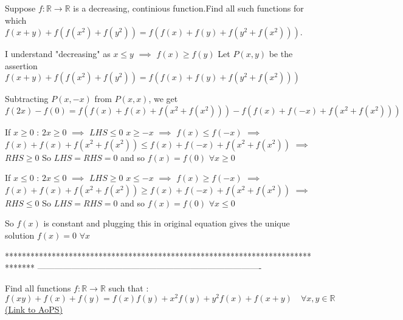 \begin{solution}
	\begin{tcolorbox}Suppose $f: \mathbb{R}\to\mathbb{R}$ is a decreasing, continious function.Find all such functions for which $f(x+y)+f(f(x^2)+f(y^2))=f(f(x)+f(y)+f(y^2+f(x^2)))$.\end{tcolorbox}
I understand "decreasing" as $x\le y$ $\implies$ $f(x)\ge f(y)$
Let $P(x,y)$ be the assertion $f(x+y)+f(f(x^2)+f(y^2))=f(f(x)+f(y)+f(y^2+f(x^2)))$

Subtracting $P(x,-x)$ from $P(x,x)$, we get $f(2x)-f(0)=f(f(x)+f(x)+f(x^2+f(x^2)))-f(f(x)+f(-x)+f(x^2+f(x^2)))$

If $x\ge 0$ :
$2x\ge 0$ $\implies$ $LHS \le  0$
$x\ge -x$ $\implies$ $f(x)\le f(-x)$ $\implies$ $f(x)+f(x)+f(x^2+f(x^2))\le f(x)+f(-x)+f(x^2+f(x^2))$ $\implies$ $RHS\ge 0$
So $LHS=RHS=0$ and so $f(x)=f(0)$ $\forall x\ge 0$

If $x\le 0$ :
$2x\le 0$ $\implies$ $LHS \ge  0$
$x\le -x$ $\implies$ $f(x)\ge f(-x)$ $\implies$ $f(x)+f(x)+f(x^2+f(x^2))\ge f(x)+f(-x)+f(x^2+f(x^2))$ $\implies$ $RHS\le 0$
So $LHS=RHS=0$ and so $f(x)=f(0)$ $\forall x\le 0$

So $f(x)$ is constant and plugging this in original equation gives the unique solution $\boxed{f(x)=0}$ $\forall x$
\end{solution}
*******************************************************************************
-------------------------------------------------------------------------------

\begin{problem}
	Find all functions $f:\mathbb{R}\to \mathbb{R}$  such that : \[f(xy)+f(x)+f(y)=f(x)f(y)+x^2f(y)+y^2f(x)+f(x+y) \quad \forall x,y\in\mathbb R\]
	\flushright \href{https://artofproblemsolving.com/community/c6h568563}{(Link to AoPS)}
\end{problem}



